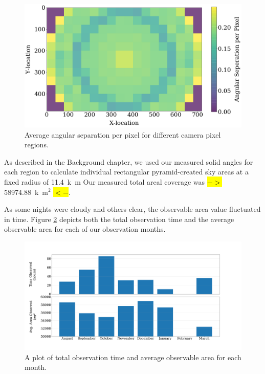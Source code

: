 \begin{figure}[ht!]
  \centering
  \includegraphics[scale=0.35]{images/boxes_colored.png}
  \caption{Average angular separation per pixel for different camera pixel regions.}
  \label{colorful}
\end{figure}

As described in the Background chapter, we used our measured solid angles for each region to calculate individual rectangular pyramid-created sky areas at a fixed radius of \SI{11.4}{k\meter}
Our measured total areal coverage was \hl{$->$} \SI{58974.88}{k\meter}$^2$ \hl{$<-$}.

As some nights were cloudy and others clear, the observable area value fluctuated in time. 
Figure \ref{time_area} depicts both the total observation time and the average observable area for each of our observation months. 

\begin{figure}[ht!]
  \centering
  \includegraphics[scale=0.25]{images/time_vs_areaobs_plot.png}
  \caption{A plot of total observation time and average observable area for each month.}
  \label{time_area}
\end{figure}

